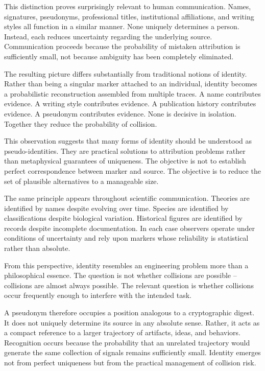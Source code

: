 \documentclass[11pt]{article}
\theoremstyle{plain}
\begin{document}
This distinction proves surprisingly relevant to human communication. Names, signatures, pseudonyms, professional titles, institutional affiliations, and writing styles all function in a similar manner. None uniquely determines a person. Instead, each reduces uncertainty regarding the underlying source. Communication proceeds because the probability of mistaken attribution is sufficiently small, not because ambiguity has been completely eliminated.

The resulting picture differs substantially from traditional notions of identity. Rather than being a singular marker attached to an individual, identity becomes a probabilistic reconstruction assembled from multiple traces. A name contributes evidence. A writing style contributes evidence. A publication history contributes evidence. A pseudonym contributes evidence. None is decisive in isolation. Together they reduce the probability of collision.

This observation suggests that many forms of identity should be understood as pseudo-identities. They are practical solutions to attribution problems rather than metaphysical guarantees of uniqueness. The objective is not to establish perfect correspondence between marker and source. The objective is to reduce the set of plausible alternatives to a manageable size.

The same principle appears throughout scientific communication. Theories are identified by names despite evolving over time. Species are identified by classifications despite biological variation. Historical figures are identified by records despite incomplete documentation. In each case observers operate under conditions of uncertainty and rely upon markers whose reliability is statistical rather than absolute.

From this perspective, identity resembles an engineering problem more than a philosophical essence. The question is not whether collisions are possible -- collisions are almost always possible. The relevant question is whether collisions occur frequently enough to interfere with the intended task.

A pseudonym therefore occupies a position analogous to a cryptographic digest. It does not uniquely determine its source in any absolute sense. Rather, it acts as a compact reference to a larger trajectory of artifacts, ideas, and behaviors. Recognition occurs because the probability that an unrelated trajectory would generate the same collection of signals remains sufficiently small. Identity emerges not from perfect uniqueness but from the practical management of collision risk.
\end{document}
